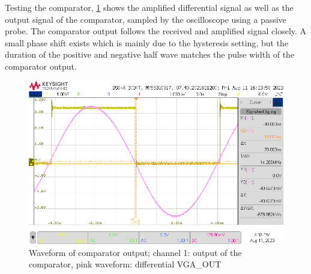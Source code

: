 \documentclass[
	english,
	ruledheaders=section, %
	class=report,%
	thesis={type=Project Seminar Report},%
	accentcolor=TUDa-1d, %
	custommargins=false,%
	marginpar=false,%
	parskip=half-,%
	fontsize=11pt,%
]{tudapub}
\begin{document}
Testing the comparator, \cref{img:piezo_comp} shows the amplified differential signal as well as the output signal of the comparator, sampled by the oscilloscope using a passive probe. The comparator output follows the received and amplified signal closely. A small phase shift exists which is mainly due to the hysteresis setting, but the duration of the positive and negative half wave matches the pulse width of the comparator output.
\begin{figure}[h]
    \centering
    \includegraphics[width=0.8\columnwidth]{images/piezo_comp1.png}
    \caption{Waveform of comparator output; channel 1: output of the comparator, pink waveform: differential VGA\_OUT}
    \label{img:piezo_comp}
\end{figure}
\end{document}
